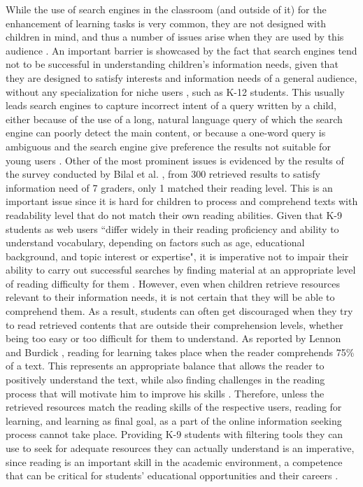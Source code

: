 \documentclass{sig-alternate-05-2015}
\begin{document}
 While the use of  search engines in the classroom (and outside of it) for the enhancement of learning tasks is very common, they are not designed with children in mind, and thus a number of issues arise when they are used by this audience \cite{Gos13,Gra03}. An important barrier is showcased by the fact that search engines tend not to be successful in understanding children's information needs, given that they are designed to satisfy interests and information needs of  a general audience, without any specialization for niche users \cite{Wan13}, such as K-12 students. This usually leads search engines to capture incorrect intent of a query written by a child, either because of the use of a long, natural language query of which the search engine can poorly detect the main content, or because a one-word query is ambiguous and the search engine give preference the results not suitable for young users \cite{Bil13}. Other of the most prominent issues is evidenced by the results of the survey conducted by Bilal et al. \cite{Bil13}, from 300 retrieved results to satisfy information need of 7 graders, only 1 matched their reading level. This is an important issue since it is hard for children to process and comprehend texts with readability level that do not match their own reading abilities. Given that K-9 students as web users ``differ widely in their reading proficiency and ability to understand vocabulary, depending on factors such as age, educational background, and topic interest or expertise", it is imperative not to impair their ability to carry out successful searches by finding material at an appropriate level of reading difficulty for them \cite{Col11}. However, even when children retrieve resources relevant to their information needs, it is not certain that they will be able to comprehend them. As a result, students can often get discouraged when they try to read retrieved contents that are outside their comprehension levels, whether being too easy or too difficult for them to understand. As reported by Lennon and Burdick \cite{Len04}, reading for learning takes place when the reader comprehends 75\% of a text. This represents an appropriate balance that allows the reader to positively understand the text, while also finding challenges in the reading process that will motivate him to improve his skills \cite{Len04}. Therefore, unless the retrieved resources match the reading skills of the respective users, reading for learning, and learning as final goal, as a part of the online information seeking process cannot take place. Providing K-9 students with filtering tools they can use to seek for adequate resources they can actually understand is an imperative, since reading is an important skill in the academic environment, a competence that can be critical for students' educational opportunities and their careers \cite{Rob00}. 
\end{document}
